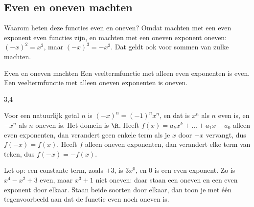 \begin{oefeningen}

\end{oefeningen}

\subsection{Even en oneven machten}

Waarom heten deze functies even en oneven? Omdat machten met een even exponent even functies zijn, en machten met een oneven exponent oneven: $(-x)^2 = x^2$, maar $(-x)^3 = -x^3$. Dat geldt ook voor sommen van zulke machten.

\begin{theorie}
\begin{stelling}{Even en oneven machten}
Een veeltermfunctie met alleen even exponenten is even. Een veeltermfunctie met alleen oneven exponenten is oneven.
\end{stelling}

\begin{alleenvoor}{3,4}
\begin{bewijs}
Voor een natuurlijk getal $n$ is $(-x)^n = (-1)^n x^n$, en dat is $x^n$ als $n$ even is, en $-x^n$ als $n$ oneven is. Het domein is $\R$. Heeft $f(x) = a_k x^k + \ldots + a_1 x + a_0$ alleen even exponenten, dan verandert geen enkele term als je $x$ door $-x$ vervangt, dus $f(-x) = f(x)$. Heeft $f$ alleen oneven exponenten, dan verandert elke term van teken, dus $f(-x) = -f(x)$.
\end{bewijs}
\end{alleenvoor}
\end{theorie}

Let op: een constante term, zoals $+3$, is $3x^0$, en $0$ is een even exponent. Zo is $x^4 - x^2 + 3$ even, maar $x^3 + 1$ niet oneven: daar staan een oneven en een even exponent door elkaar. Staan beide soorten door elkaar, dan toon je met één tegenvoorbeeld aan dat de functie even noch oneven is.



